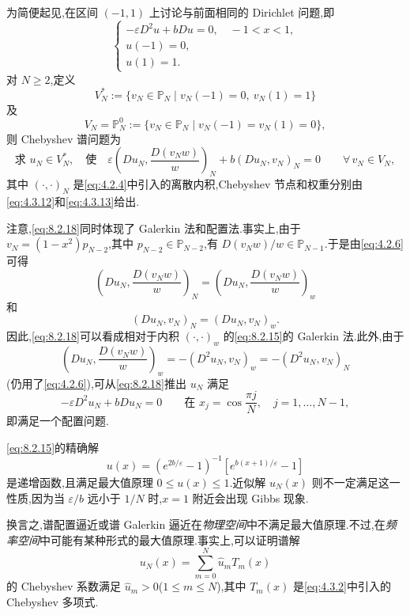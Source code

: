 为简便起见,在区间 \((-1,1)\) 上讨论与前面相同的 Dirichlet 问题,即
\begin{equation}\label{eq:8.2.15}
  \begin{cases}
    -\varepsilon D^2u+bDu=0,\quad -1<x<1,\\
    u(-1)=0,\\
    u(1)=1.
  \end{cases}
\end{equation}
对 \(N\ge2\),定义
\begin{equation}\label{eq:8.2.16}
  V_N^*:=\{v_N\in\mathbb P_N\mid v_N(-1)=0,\ v_N(1)=1\}
\end{equation}
及
\begin{equation}\label{eq:8.2.17}
  V_N=\mathbb P_N^0:=\{v_N\in\mathbb P_N\mid v_N(-1)=v_N(1)=0\},
\end{equation}
则 Chebyshev 谱问题为
\begin{equation}\label{eq:8.2.18}
  \text{求 }u_N\in V_N^*,\quad\text{使}\quad
  \varepsilon\left(Du_N,\frac{D(v_Nw)}w\right)_N
       +b(Du_N,v_N)_N=0\qquad\forall\,v_N\in V_N,
\end{equation}
其中 \((\cdot,\cdot)_N\) 是\eqref{eq:4.2.4}中引入的离散内积,Chebyshev 节点和权重分别由\eqref{eq:4.3.12}和\eqref{eq:4.3.13}给出.

注意,\eqref{eq:8.2.18}同时体现了 Galerkin 法和配置法.事实上,由于 \(v_N=(1-x^2)p_{N-2}\),其中 \(p_{N-2}\in\mathbb P_{N-2}\),有 \(D(v_Nw)/w\in\mathbb P_{N-1}\).于是由\eqref{eq:4.2.6}可得
\[
  \left(Du_N,\frac{D(v_Nw)}w\right)_N
    =\left(Du_N,\frac{D(v_Nw)}w\right)_w
\]
和
\[
  (Du_N,v_N)_N=(Du_N,v_N)_w.
\]
因此,\eqref{eq:8.2.18}可以看成相对于内积 \((\cdot,\cdot)_w\) 的\eqref{eq:8.2.15}的 Galerkin 法.此外,由于
\[
  \left(Du_N,\frac{D(v_Nw)}w\right)_w
      =-(D^2u_N,v_N)_w=-(D^2u_N,v_N)_N
\]
(仍用了\eqref{eq:4.2.6}),可从\eqref{eq:8.2.18}推出 \(u_N\) 满足
\[
  -\varepsilon D^2u_N+bDu_N=0\qquad
  \text{在 }x_j=\cos\frac{\pi j}{N},\quad j=1,\ldots,N-1,
\]
即满足一个配置问题.

\eqref{eq:8.2.15}的精确解
\[
  u(x)=(e^{2b/\varepsilon}-1)^{-1}[e^{b(x+1)/\varepsilon}-1]
\]
是递增函数,且满足最大值原理 \(0\le u(x)\le1\).近似解 \(u_N(x)\) 则不一定满足这一性质,因为当 \(\varepsilon/b\) 远小于 \(1/N\) 时,\(x=1\) 附近会出现 Gibbs 现象.

换言之,谱配置逼近或谱 Galerkin 逼近在\emph{物理空间}中不满足最大值原理.不过,在\emph{频率空间}中可能有某种形式的最大值原理.事实上,可以证明谱解
\[
  u_N(x)=\sum_{m=0}^N\widehat u_mT_m(x)
\]
的 Chebyshev 系数满足 \(\widehat u_m>0\)(\(1\le m\le N\)),其中 \(T_m(x)\) 是\eqref{eq:4.3.2}中引入的 Chebyshev 多项式.

